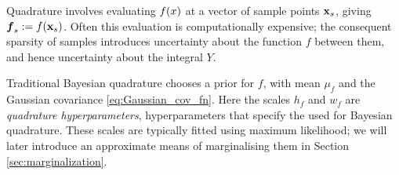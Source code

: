 \documentclass{article}
\begin{document}
Quadrature involves evaluating $f(\lfv)$ at a vector of sample points $\vlfv_s$, giving $\vf\pha_s\deq f(\vlfv_s)$. Often this evaluation is computationally expensive; the consequent sparsity of samples introduces uncertainty about the function $f$ between them, and hence uncertainty about the integral $Y$.



Traditional Bayesian quadrature chooses a \gpb prior for $f$, with mean $\mu_f$ and the Gaussian covariance \eqref{eq:Gaussian_cov_fn}. Here the scales $h_f$ and $w_f$ are \emph{quadrature hyperparameters}, hyperparameters that specify the  \gpb used for Bayesian quadrature. These scales are typically fitted using maximum likelihood; we will later introduce an approximate means of marginalising them in Section \ref{sec:marginalization}.

\end{document}
